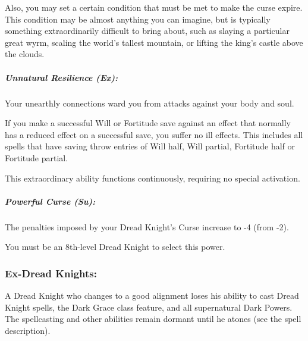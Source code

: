 Also, you may set a certain condition that must be met to make the curse expire. This condition may be almost anything you can imagine, but is typically something extraordinarily difficult to bring about, such as slaying a particular great wyrm, scaling the world's tallest mountain, or lifting the king's castle above the clouds.

\subparagraph{Unnatural Resilience (Ex):}  
Your unearthly connections ward you from attacks against your body and soul. 

If you make a successful Will or Fortitude save against an effect that normally has a reduced effect on a successful save, you suffer no ill effects. This includes all spells that have saving throw entries of Will half, Will partial, Fortitude half or Fortitude partial.

This extraordinary ability functions continuously, requiring no special activation.

\subparagraph[Powerful Curse]{Powerful Curse (Su):}
\label{sec:PowerfulCurse}
The penalties imposed by your Dread Knight's Curse increase to -4 (from -2).

You must be an 8th-level Dread Knight to select this power.

\subsubsection{Ex-Dread Knights:}
A Dread Knight who changes to a good alignment loses his ability to cast Dread Knight spells, the Dark Grace class feature, and all supernatural Dark Powers.
The spellcasting and other abilities remain dormant until he atones (see the  spell description).


